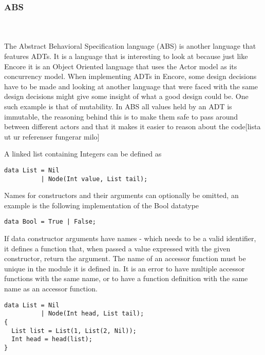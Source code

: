 \documentclass[10pt]{report}
\begin{document}
\subsubsection{ABS}
\par{\noindent \\\\The Abstract Behavioral Specification language (ABS) is another language that features ADTs. It is a language that is interesting to look at because just like Encore it is an Object Oriented language that uses the Actor model as its concurrency model. When implementing ADTs in Encore, some design decisions have to be made and looking at another language that were faced with the same design decisions might give some insight of what a good design could be. One such example is that of mutability. In ABS all values held by an ADT is immutable, the reasoning behind this is to make them safe to pass around between different actors and that it makes it easier to reason about the code[lista ut ur referenser fungerar milo]\\}
\par{\noindent A linked list containing Integers can be defined as\\}
\begin{lstlisting}[language=encore,caption={Linked list in ABS}]
data List = Nil
          | Node(Int value, List tail);
\end{lstlisting}
\par{\noindent Names for constructors and their arguments can optionally be omitted, an example is the following implementation of the Bool datatype\\}
\begin{lstlisting}[language=encore,caption={Actual definition of built-in type Bool}]
data Bool = True | False;
\end{lstlisting}
\par{\noindent If data constructor arguments have names - which needs to be a valid identifier, it defines a function that, when passed a value expressed with the given constructor, return the argument.  The name of an accessor function must be unique in the module it is defined in. It is an error to have multiple accessor functions with the same name, or to have a function definition with the same name as an accessor function.\\}

\begin{lstlisting}[language=encore,caption={Accessor funtion in ABS, variable head on line 5 is assigned 1}]
data List = Nil
          | Node(Int head, List tail);
{
  List list = List(1, List(2, Nil));
  Int head = head(list); 
}
\end{lstlisting}
\end{document}
